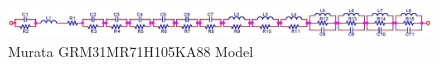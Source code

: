 \begin{figure}[ht!]
\includegraphics[keepaspectratio=true,width=6in]{./figures/regression/murataModel.jpg}
\centering
\caption{Murata GRM31MR71H105KA88 Model~\cite{simSurfing}}
\label{fig:murataModel}
\end{figure}

